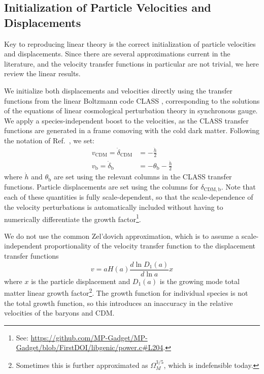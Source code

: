 \documentclass[a4paper,11pt]{article}
\begin{document}
\subsection{Initialization of Particle Velocities and Displacements}
\label{sec:particles}

Key to reproducing linear theory is the correct initialization of particle velocities and displacements. Since there are several approximations current in the literature, and the velocity transfer functions in particular are not trivial, we here review the linear results.

We initialize both displacements and velocities directly using the transfer functions from the linear Boltzmann code CLASS \cite{CLASS}, corresponding to the solutions of the equations of linear cosmological perturbation theory in synchronous gauge. We apply a species-independent boost to the velocities, as the CLASS transfer functions are generated in a frame comoving with the cold dark matter. Following the notation of Ref.~\cite{Ma:1995}, we set:
\begin{align}
 v_\mathrm{CDM} = \dot{\delta}_\mathrm{CDM}  &= - \frac{\dot{h}}{2} \\
 v_\mathrm{b} = \dot{\delta}_\mathrm{b}  &= - \theta_\mathrm{b} - \frac{\dot{h}}{2}
\end{align}
where $\dot{h}$ and $\theta_\mathrm{b}$ are set using the relevant columns in the CLASS transfer functions.
Particle displacements are set using the columns for $\delta_\mathrm{CDM, b}$. Note that each of these quantities is fully scale-dependent, so that the scale-dependence of the velocity perturbations is automatically included without having to numerically differentiate the growth factor\footnote{See: \protect\url{https://github.com/MP-Gadget/MP-Gadget/blob/FirstDOI/libgenic/power.c\#L204}.}.

We do not use the common Zel'dovich approximation, which is to assume a scale-independent proportionality of the velocity transfer function to the displacement transfer functions
\begin{equation}
 v = a H(a) \frac{d \ln D_1(a)}{d \ln a} x
\end{equation}
where $x$ is the particle displacement and $D_1(a)$ is the growing mode total matter linear growth factor\footnote{Sometimes this is further approximated as $\Omega_M^{3/5}$, which is indefensible today.}. The growth function for individual species is not the total growth function, so this introduces an inaccuracy in the relative velocities of the baryons and CDM.
\end{document}
